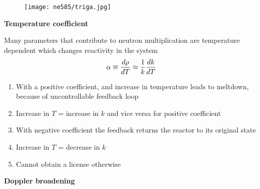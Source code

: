\documentclass[aspectratio=1610,pdftex,dvipsnames,compress,xcolor={dvipsnames}]{beamer}
\begin{document}
\begin{frame}{}
    \begin{figure}
        \centering
        \texttt{[image: ne585/triga.jpg]}
    \end{figure}
\end{frame}


\begin{frame}[plain]{}
    \centering\LARGE\textbf{Temperature coefficient}
\end{frame}


\addtocounter{framenumber}{-1} 
\begin{frame}{Many parameters that contribute to neutron multiplication are temperature dependent which changes reactivity in the system}
    \begin{equation}
        \LARGE
        \alpha \equiv \frac{d\rho}{dT} \approx \frac{1}{k} \frac{dk}{dT}
    \end{equation}

    \vspace*{\fill}

    \begin{enumerate}[series=outerlist,topsep=0pt,itemsep=21pt,leftmargin=*,label=(\arabic*)]
        \item[]With a positive coefficient, and increase in temperature leads to meltdown, because of uncontrollable feedback loop
        \item[]Increase in $T$ = increase in $k$ and vice versa for positive coefficient
        \item[]With negative coefficient the feedback returns the reactor to its original state
        \item[]Increase in $T$ = decrease in $k$
        \item[]Cannot obtain a license otherwise
    \end{enumerate}
\end{frame}


\begin{frame}[plain]{}
    \centering\LARGE\textbf{Doppler broadening}
\end{frame}
\end{document}
